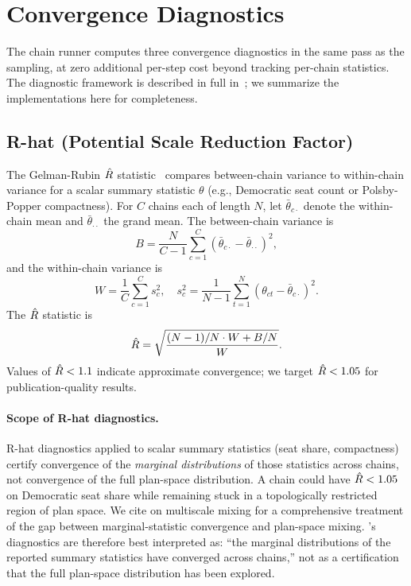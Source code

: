 \section{Convergence Diagnostics}
\label{sec:diagnostics}

The \re{} chain runner computes three convergence diagnostics in the
same pass as the sampling, at zero additional per-step cost beyond
tracking per-chain statistics.
The diagnostic framework is described in full in~\citet{dellaLibera2026g4};
we summarize the implementations here for completeness.

\subsection{R-hat (Potential Scale Reduction Factor)}

The Gelman-Rubin $\hat{R}$ statistic~\citep{gelman1992inference} compares
between-chain variance to within-chain variance for a scalar summary
statistic $\theta$ (e.g., Democratic seat count or Polsby-Popper
compactness).
For $C$ chains each of length $N$, let $\bar{\theta}_{c\cdot}$ denote
the within-chain mean and $\bar{\theta}_{\cdot\cdot}$ the grand mean.
The between-chain variance is
\[
  B = \frac{N}{C-1}\sum_{c=1}^C (\bar{\theta}_{c\cdot} - \bar{\theta}_{\cdot\cdot})^2,
\]
and the within-chain variance is
\[
  W = \frac{1}{C}\sum_{c=1}^C s_c^2,
  \quad s_c^2 = \frac{1}{N-1}\sum_{t=1}^N (\theta_{ct} - \bar{\theta}_{c\cdot})^2.
\]
The $\hat{R}$ statistic is
\[
  \hat{R} = \sqrt{\frac{(N-1)/N \cdot W + B/N}{W}}.
\]
Values of $\hat{R} < 1.1$ indicate approximate convergence; we target
$\hat{R} < 1.05$ for publication-quality results.

\paragraph{Scope of R-hat diagnostics.}
R-hat diagnostics applied to scalar summary statistics (seat share,
compactness) certify convergence of the \emph{marginal distributions}
of those statistics across chains, not convergence of the full
plan-space distribution.
A chain could have $\hat{R} < 1.05$ on Democratic seat share while
remaining stuck in a topologically restricted region of plan space.
We cite \citet{autry2021multiscale} on multiscale mixing for a
comprehensive treatment of the gap between marginal-statistic
convergence and plan-space mixing.
\re{}'s diagnostics are therefore best interpreted as: ``the marginal
distributions of the reported summary statistics have converged across
chains,'' not as a certification that the full plan-space distribution
has been explored.

